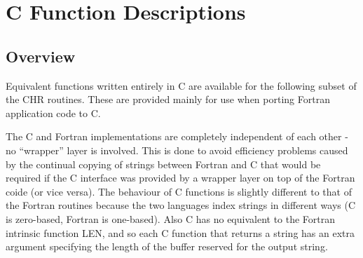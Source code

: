 \documentclass[twoside,11pt,nolof]{starlink}
\begin{document}
\section {C Function Descriptions \label{c_funcs}}

\subsection{Overview}
Equivalent functions written entirely in C are available for the
following subset of the CHR routines. These are provided mainly for use
when porting Fortran application code to C.

The C and Fortran implementations are completely independent of each
other - no ``wrapper'' layer is involved. This is done to avoid
efficiency problems caused by the continual copying of strings between
Fortran and C that would be required if the C interface was provided by a
wrapper layer on top of the Fortran coide (or vice versa). The behaviour
of C functions is slightly different to that of the Fortran routines
because the two languages index strings in different ways (C is
zero-based, Fortran is one-based). Also C has no equivalent to the
Fortran intrinsic function LEN, and so each C function that returns a
string has an extra argument specifying the length of the buffer reserved
for the output string.
\end{document}
